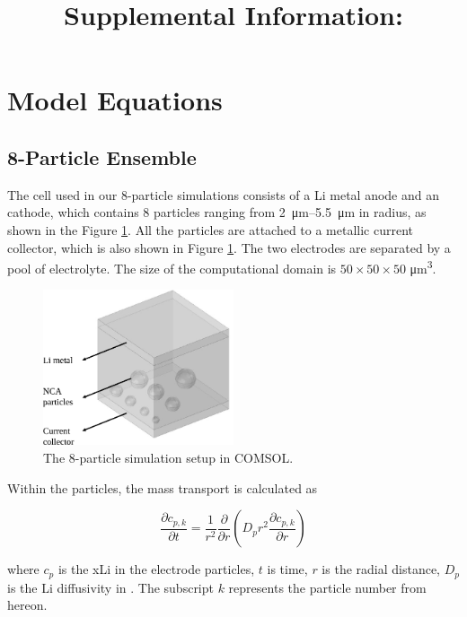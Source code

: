 \documentclass{article}
\title{Supplemental Information: \mytitle}
\begin{document}
\maketitle


\section{Model Equations}

\subsection{8-Particle Ensemble}

The cell used in our 8-particle simulations consists of a Li metal
anode and an \nca{} cathode, which contains 8 particles ranging from
\SIrange{2}{5.5}{\micro\meter} in radius, as shown in the Figure
\ref{fig:8-particle-box}. All the particles are attached to a metallic current
collector, which is also shown in
Figure \ref{fig:8-particle-box}. The two electrodes are separated by
a pool of electrolyte. The size of the computational domain is
$50\times 50\times 50$ \si{\micro\meter\cubed}.

\begin{figure}
  \centering
  \includegraphics[width=0.5\textwidth]{8-particle-simulation.pdf}
  \caption{The 8-particle simulation setup in COMSOL.}
  \label{fig:8-particle-box}
\end{figure}

Within the \nca{} particles, the mass transport is calculated
as\cite{newman1993,newman1994}

\begin{equation}
  \frac{\partial c_{p,k}}{\partial t}=\frac 1{r^2}\frac \partial {\partial r}\left(D_pr^2\frac{\partial c_{p,k}}{\partial r}\right)
  \label{eq:1a}
\end{equation}
  
where $c_p$ is the \gls{xLi} in the electrode particles, $t$ is time,
$r$ is the radial distance, $D_p$ is the Li diffusivity in \nca{}. The
subscript $k$ represents the particle number from hereon.
\end{document}
